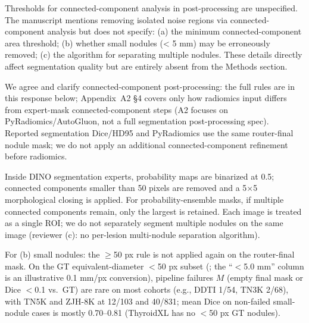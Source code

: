 \begin{reviewercomment}
Thresholds for connected-component analysis in post-processing are unspecified. The manuscript mentions removing isolated noise regions via connected-component analysis but does not specify: (a) the minimum connected-component area threshold; (b) whether small nodules (< 5 mm) may be erroneously removed; (c) the algorithm for separating multiple nodules. These details directly affect segmentation quality but are entirely absent from the Methods section.
\end{reviewercomment}
\begin{authorresponse}
We agree and clarify connected-component post-processing: the full rules are in this response below; Appendix~A2 §4 covers only how radiomics input differs from expert-mask connected-component steps (A2 focuses on PyRadiomics/AutoGluon, not a full segmentation post-processing spec). Reported segmentation Dice/HD95 and PyRadiomics use the same router-final nodule mask; we do not apply an additional connected-component refinement before radiomics.\par
Inside DINO segmentation experts, probability maps are binarized at 0.5; connected components smaller than 50 pixels are removed and a 5$\times$5 morphological closing is applied. For probability-ensemble masks, if multiple connected components remain, only the largest is retained. Each image is treated as a single ROI; we do not separately segment multiple nodules on the same image (reviewer (c): no per-lesion multi-nodule separation algorithm).\par
For (b) small nodules: the $\geq$50 px rule is not applied again on the router-final mask. On the GT equivalent-diameter $<$50 px subset (; the ``$<$5.0 mm'' column is an illustrative 0.1 mm/px conversion), pipeline failures $M$ (empty final mask or Dice $<$0.1 vs.\ GT) are rare on most cohorts (e.g., DDTI 1/54, TN3K 2/68), with TN5K and ZJH-8K at 12/103 and 40/831; mean Dice on non-failed small-nodule cases is mostly 0.70--0.81 (ThyroidXL has no $<$50 px GT nodules).\par
\par
\end{authorresponse}

